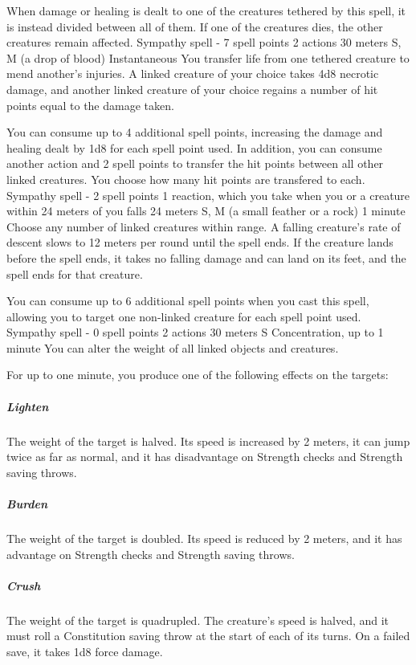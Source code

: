         When damage or healing is dealt to one of the creatures tethered by this spell, it is instead divided between all of them.
        If one of the creatures dies, the other creatures remain affected.
        {Sympathy spell - 7 spell points}
        {2 actions}
        {30 meters}
        {S, M (a drop of blood)}
        {Instantaneous}
        You transfer life from one tethered creature to mend another's injuries.
        A linked creature of your choice takes 4d8 necrotic damage, and another linked creature of your choice regains a number of hit points equal to the damage taken.

        You can consume up to 4 additional spell points, increasing the damage and healing dealt by 1d8 for each spell point used.
        In addition, you can consume another action and 2 spell points to transfer the hit points between all other linked creatures.
        You choose how many hit points are transfered to each.
        {Sympathy spell - 2 spell points}
        {1 reaction, which you take when you or a creature within 24 meters of you falls}
        {24 meters}
        {S, M (a small feather or a rock)}
        {1 minute}
        Choose any number of linked creatures within range.
        A falling creature's rate of descent slows to 12 meters per round until the spell ends.
        If the creature lands before the spell ends, it takes no falling damage and can land on its feet, and the spell ends for that creature.

        You can consume up to 6 additional spell points when you cast this spell, allowing you to target one non-linked creature for each spell point used.
        {Sympathy spell - 0 spell points}
        {2 actions}
        {30 meters}
        {S}
        {Concentration, up to 1 minute}
        You can alter the weight of all linked objects and creatures.

        For up to one minute, you produce one of the following effects on the targets:
        \subparagraph{Lighten}
        The weight of the target is halved.
        Its speed is increased by 2 meters, it can jump twice as far as normal, and it has disadvantage on Strength checks and Strength saving throws.
        \subparagraph{Burden}
        The weight of the target is doubled.
        Its speed is reduced by 2 meters, and it has advantage on Strength checks and Strength saving throws.
        \subparagraph{Crush}
        The weight of the target is quadrupled.
        The creature's speed is halved, and it must roll a Constitution saving throw at the start of each of its turns.
        On a failed save, it takes 1d8 force damage.
